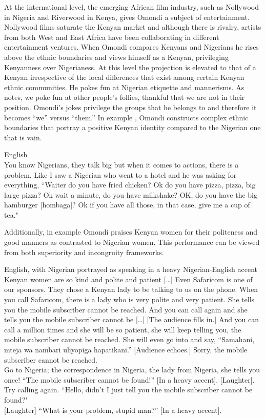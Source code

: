 \documentclass[output=paper]{langsci/langscibook}
\begin{document}
At the international level, the emerging African film industry, such as Nollywood in Nigeria and Riverwood in Kenya, gives Omondi a subject of entertainment. Nollywood films saturate the Kenyan market and although there is rivalry, artists from both West and East Africa have been collaborating in different entertainment ventures. When Omondi compares Kenyans and Nigerians he rises above the ethnic boundaries and views himself as a Kenyan, privileging Kenyanness over Nigerianess. At this level the projection is elevated to that of a Kenyan irrespective of the local differences that exist among certain Kenyan ethnic communities. He pokes fun at Nigerian etiquette and mannerisms. As \citet{Labrador2004} notes, we poke fun at other people’s follies, thankful that we are not in their position. Omondi’s jokes privilege the groups that he belongs to and therefore it becomes “we” versus “them.” In example , Omondi constructs complex ethnic boundaries that portray a positive Kenyan identity compared to the Nigerian one that is vain.

\ea\label{ex:muaka:4}
{English }\\
\smallskip
  You know Nigerians, they talk big but when it comes to actions, there is a problem. Like I saw a Nigerian who went to a hotel and he was asking for everything, “Waiter do you have fried chicken? Ok do you have pizza, pizza, big large pizza? Ok wait a minute, do you have milkshake? OK, do you have the big hamburger \textup{[hombaga]}? Ok if you have all those, in that case, give me a cup of tea."  \citep{Omogi2012}
\z

Additionally, in example  Omondi praises Kenyan women for their politeness and good manners as contrasted to Nigerian women. This performance can be viewed from both superiority and incongruity frameworks.

\ea\label{ex:muaka:5}
{English, with Nigerian portrayed as speaking in a heavy Nigerian-English accent}\\
\smallskip
Kenyan women are so kind and polite and patient […] Even Safaricom is one of our sponsors. They chose a Kenyan lady to be talking to us on the phone. When you call Safaricom, there is a lady who is very polite and very patient. She tells you the mobile subscriber cannot be reached. And you can call again and she tells you the mobile subscriber cannot be […] \textup{[The audience fills in.]} And you can call a million times and she will be so patient, she will keep telling you, the mobile subscriber cannot be reached. She will even go into  and say, ``Samahani, mteja wa nambari uliyopiga hapatikani.” \textup{[Audience echoes.]} Sorry, the mobile subscriber cannot be reached.\\
Go to Nigeria; the correspondence in Nigeria, the lady from Nigeria, she tells you 
once! “The mobile subscriber cannot be found!” \textup{[In a heavy  accent]. [Laughter].}\\
Try calling again. “Hello, didn’t I just tell you the mobile subscriber cannot be found?" \\
\textup{[Laughter]} “What is your problem, stupid man?” \textup{[In a heavy  accent].} \citep{Omogi2012}
\z
\end{document}
